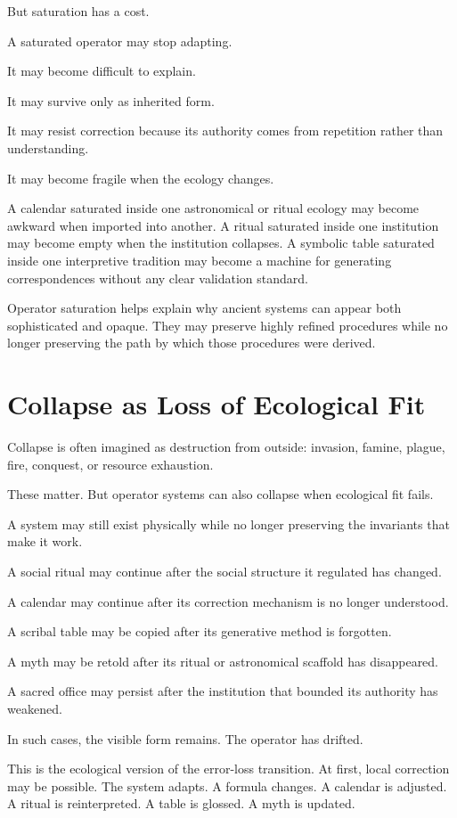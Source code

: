 \documentclass[11pt]{book}
\begin{document}
But saturation has a cost.

A saturated operator may stop adapting.

It may become difficult to explain.

It may survive only as inherited form.

It may resist correction because its authority comes from repetition rather than understanding.

It may become fragile when the ecology changes.

A calendar saturated inside one astronomical or ritual ecology may become awkward when imported into another. A ritual saturated inside one institution may become empty when the institution collapses. A symbolic table saturated inside one interpretive tradition may become a machine for generating correspondences without any clear validation standard.

Operator saturation helps explain why ancient systems can appear both sophisticated and opaque. They may preserve highly refined procedures while no longer preserving the path by which those procedures were derived.

\section{Collapse as Loss of Ecological Fit}

Collapse is often imagined as destruction from outside: invasion, famine, plague, fire, conquest, or resource exhaustion.

These matter. But operator systems can also collapse when ecological fit fails.

A system may still exist physically while no longer preserving the invariants that make it work.

A social ritual may continue after the social structure it regulated has changed.

A calendar may continue after its correction mechanism is no longer understood.

A scribal table may be copied after its generative method is forgotten.

A myth may be retold after its ritual or astronomical scaffold has disappeared.

A sacred office may persist after the institution that bounded its authority has weakened.

In such cases, the visible form remains. The operator has drifted.

This is the ecological version of the error-loss transition. At first, local correction may be possible. The system adapts. A formula changes. A calendar is adjusted. A ritual is reinterpreted. A table is glossed. A myth is updated.
\end{document}
